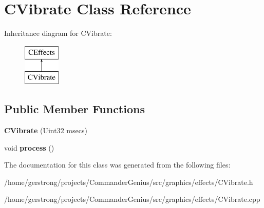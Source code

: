 \hypertarget{class_c_vibrate}{
\section{CVibrate Class Reference}
\label{class_c_vibrate}
}
Inheritance diagram for CVibrate:\begin{figure}[H]
\begin{center}
\leavevmode
\includegraphics[height=2cm]{class_c_vibrate}
\end{center}
\end{figure}
\subsection*{Public Member Functions}
\begin{DoxyCompactItemize}
\item 
\hypertarget{class_c_vibrate_afe798467ba5cc581f131256e004d5978}{
{\bfseries CVibrate} (Uint32 msecs)}
\label{class_c_vibrate_afe798467ba5cc581f131256e004d5978}

\item 
\hypertarget{class_c_vibrate_aaf3657fbf68aad55ae7e0e780ecac3cf}{
void {\bfseries process} ()}
\label{class_c_vibrate_aaf3657fbf68aad55ae7e0e780ecac3cf}

\end{DoxyCompactItemize}


The documentation for this class was generated from the following files:\begin{DoxyCompactItemize}
\item 
/home/gerstrong/projects/CommanderGenius/src/graphics/effects/CVibrate.h\item 
/home/gerstrong/projects/CommanderGenius/src/graphics/effects/CVibrate.cpp\end{DoxyCompactItemize}
